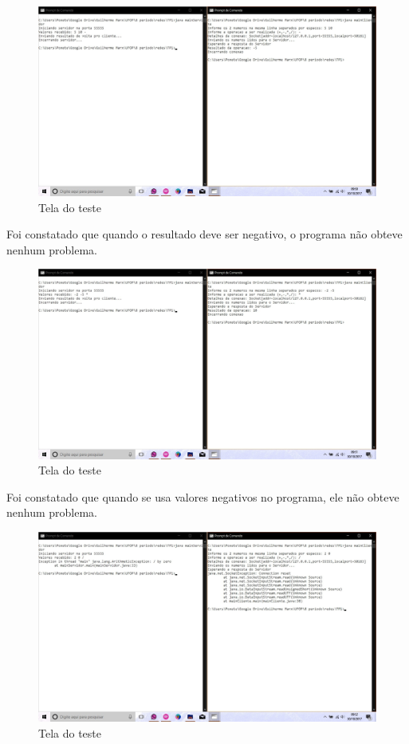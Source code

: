 \documentclass[brazil, a4paper,12pt]{article}
\begin{document}
\begin{itemize}
	\newpage
	
	\begin{figure}[ht!]
		\centering
		\includegraphics[scale=0.45]{teste5.jpg}
		\caption{Tela do teste}
		\label{Rotulo}
	\end{figure}
	
	Foi constatado que quando o resultado deve ser negativo, o programa não obteve nenhum problema.
	
	\newpage
	
	\begin{figure}[ht!]
		\centering
		\includegraphics[scale=0.45]{teste6.jpg}
		\caption{Tela do teste}
		\label{Rotulo}
	\end{figure}
	
	Foi constatado que quando se usa valores negativos no programa, ele não obteve nenhum problema.
	
	\newpage

	\begin{figure}[ht!]
		\centering
		\includegraphics[scale=0.45]{teste7.jpg}
		\caption{Tela do teste}
		\label{Rotulo}
	\end{figure}
	

\end{itemize}
\end{document}
